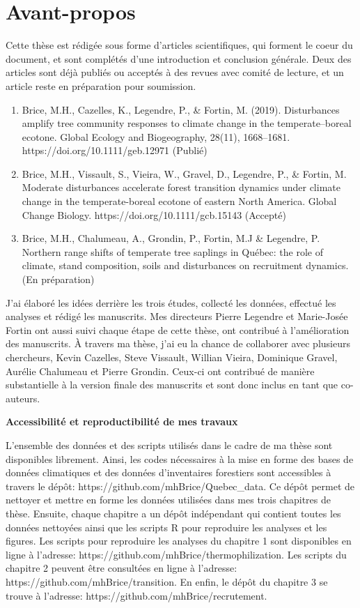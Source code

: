 \francais

\chapter*{Avant-propos}

Cette thèse est rédigée sous forme d'articles scientifiques, qui forment
le coeur du document, et sont complétés d'une introduction et conclusion
générale. Deux des articles sont déjà publiés ou acceptés à des revues
avec comité de lecture, et un article reste en préparation pour
soumission.

\begin{enumerate}
\def\labelenumi{\arabic{enumi}.}
\item
  Brice, M.H., Cazelles, K., Legendre, P., \& Fortin, M. (2019).
  Disturbances amplify tree community responses to climate change in the
  temperate--boreal ecotone. Global Ecology and Biogeography, 28(11),
  1668--1681. https://doi.org/10.1111/geb.12971 (Publié)
\item
  Brice, M.H., Vissault, S., Vieira, W., Gravel, D., Legendre, P., \&
  Fortin, M. Moderate disturbances accelerate forest transition dynamics
  under climate change in the temperate-boreal ecotone of eastern North
  America. Global Change Biology. https://doi.org/10.1111/gcb.15143
  (Accepté)
\item
  Brice, M.H., Chalumeau, A., Grondin, P., Fortin, M.J \& Legendre, P.
  Northern range shifts of temperate tree saplings in Québec: the role
  of climate, stand composition, soils and disturbances on recruitment
  dynamics. (En préparation)
\end{enumerate}

J'ai élaboré les idées derrière les trois études, collecté les données,
effectué les analyses et rédigé les manuscrits. Mes directeurs Pierre
Legendre et Marie-Josée Fortin ont aussi suivi chaque étape de cette
thèse, ont contribué à l'amélioration des manuscrits. À travers ma
thèse, j'ai eu la chance de collaborer avec plusieurs chercheurs, Kevin
Cazelles, Steve Vissault, Willian Vieira, Dominique Gravel, Aurélie
Chalumeau et Pierre Grondin. Ceux-ci ont contribué de manière
substantielle à la version finale des manuscrits et sont donc inclus en
tant que co-auteurs.

\textbf{Accessibilité et reproductibilité de mes travaux}

L'ensemble des données et des scripts utilisés dans le cadre de ma thèse
sont disponibles librement. Ainsi, les codes nécessaires à la mise en
forme des bases de données climatiques et des données d'inventaires
forestiers sont accessibles à travers le dépôt:
https://github.com/mhBrice/Quebec\_data. Ce dépôt permet de nettoyer et
mettre en forme les données utilisées dans mes trois chapitres de thèse.
Ensuite, chaque chapitre a un dépôt indépendant qui contient toutes les
données nettoyées ainsi que les scripts R pour reproduire les analyses
et les figures. Les scripts pour reproduire les analyses du chapitre 1
sont disponibles en ligne à l'adresse:
https://github.com/mhBrice/thermophilization. Les scripts du chapitre 2
peuvent être consultées en ligne à l'adresse:
https://github.com/mhBrice/transition. En enfin, le dépôt du chapitre 3
se trouve à l'adresse: https://github.com/mhBrice/recrutement.
